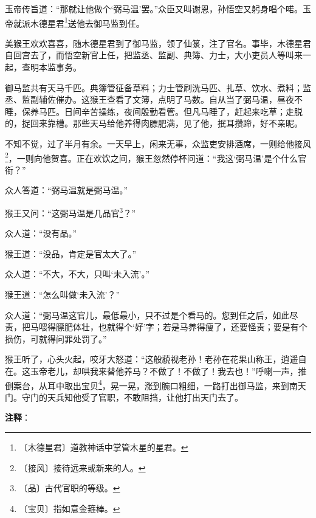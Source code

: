 \documentclass[12pt,UTF-8,openany]{ctexbook}
\begin{document}
\begin{Large}
    玉帝传旨道：“那就让他做个‘弼马温’罢。”众臣又叫谢恩，孙悟空又躬身唱个喏。玉帝就派木德星君\footnote{〔木德星君〕道教神话中掌管木星的星君。}送他去御马监到任。
    
    美猴王欢欢喜喜，随木德星君到了御马监，领了仙箓，注了官名。事毕，木德星君自回宫去了，而悟空新官上任，把监丞、监副、典簿、力士，大小吏员人等叫来一起，查明本监事务。
    
    御马监共有天马千匹。典簿管征备草料；力士管刷洗马匹、扎草、饮水、煮料；监丞、监副辅佐催办。这猴王查看了文簿，点明了马数。自从当了弼马温，昼夜不睡，保养马匹。日间辛苦操练，夜间殷勤看管。但凡马睡了，赶起来吃草；走脱的，捉回来靠槽。那些天马给他养得肉膘肥满，见了他，抿耳攒蹄，好不亲昵。
    
    不知不觉，过了半月有余。一天早上，闲来无事，众监吏安排酒席，一则给他接风\footnote{〔接风〕接待远来或新来的人。}，一则向他贺喜。正在欢饮之间，猴王忽然停杯问道：“我这‘弼马温’是个什么官衔？”
    
    众人答道：“弼马温就是弼马温。”
    
    猴王又问：“这弼马温是几品官\footnote{〔品〕古代官职的等级。}？”
    
    众人道：“没有品。”
    
    猴王道：“没品，肯定是官太大了。”
    
    众人道：“不大，不大，只叫‘未入流’。”
    
    猴王道：“怎么叫做‘未入流’？”
    
    众人道：“弼马温这官儿，最低最小，只不过是个看马的。您到任之后，如此尽责，把马喂得膘肥体壮，也就得个‘好’字；若是马养得瘦了，还要怪责；要是有个损伤，可就得问罪处罚了。”
    
    猴王听了，心头火起，咬牙大怒道：“这般藐视老孙！老孙在花果山称王，逍遥自在。这玉帝老儿，却哄我来替他养马？不做了！不做了！我去也！”呼喇一声，推倒案台，从耳中取出宝贝\footnote{〔宝贝〕指如意金箍棒。}，晃一晃，涨到腕口粗细，一路打出御马监，来到南天门。守门的天兵知他受了官职，不敢阻挡，让他打出天门去了。
    
\end{Large}


\newpage

\textbf{注释}：

\vspace{-1em}
\end{document}
